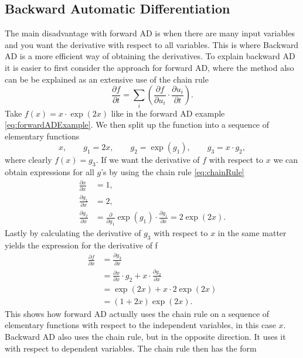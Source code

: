 \subsection{Backward Automatic Differentiation}
The main disadvantage with forward AD is when there are many input variables and you want the derivative with respect to all variables. This is where Backward AD is a more efficient way of obtaining the derivatives. To explain backward AD it is easier to first consider the approach for forward AD, where the method also can be be explained as an extensive use of the chain rule
\begin{equation}
    \label{eq:chainRule}
    \frac{\partial f}{\partial t} = \sum_i\left(\frac{\partial f}{\partial u_i}\cdot\frac{\partial u_i}{\partial t}\right).
\end{equation}
Take $f(x) = x\cdot\exp(2x)$ like in the forward AD example \eqref{eq:forwardADExample}. We then split up the function into a sequence of elementary functions
\begin{equation}
    \label{eq:BackwardADSeperationSimple}
    x, \hspace{2em} g_1 = 2x, \hspace{2em} g_2 = \exp(g_1), \hspace{2em} g_3 = x\cdot g_2,
\end{equation}
where clearly $f(x) = g_3$. If we want the derivative of $f$ with respect to $x$ we can obtain expressions for all $g$'s by using the chain rule \eqref{eq:chainRule}
\begin{align*}
     \frac{\partial x}{\partial x} &= 1, \\
     \frac{\partial g_1}{\partial x} &= 2, \\
     \frac{\partial g_2}{\partial x} &= \frac{\partial}{\partial g_1}\exp(g_1)\cdot\frac{\partial g_1}{\partial x} = 2\exp(2x).
\end{align*}
Lastly by calculating the derivative of $g_3$ with respect to $x$ in the same matter yields the expression for the derivative of f
\begin{align*}
    \frac{\partial f}{\partial x} &= \frac{\partial g_3}{\partial x}\\
    &=\frac{\partial x}{\partial x}\cdot g_2 + x\cdot\frac{\partial g_2}{\partial x}\\
    &= \exp(2x) + x\cdot 2\exp(2x) \\
    &= (1+2x)\exp(2x).
\end{align*}
This shows how forward AD actually uses the chain rule on a sequence of elementary functions with respect to the independent variables, in this case $x$. Backward AD also uses the chain rule, but in the opposite direction. It uses it with respect to dependent variables. The chain rule then has the form
